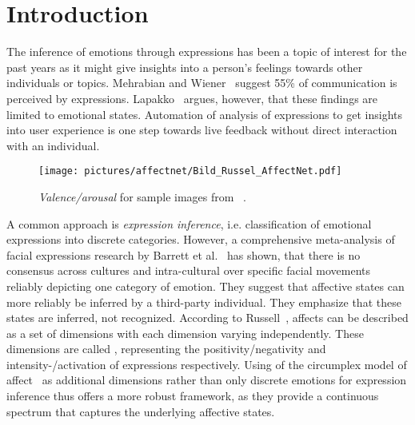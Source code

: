 \section{Introduction}
\label{sec:intro} 

The inference of emotions through expressions has been a topic of interest for the past years as it might give insights into a person's feelings towards other individuals or topics. Mehrabian and Wiener~\cite{mehrabian1967decoding} suggest 55\% of communication is perceived by expressions. Lapakko~\cite{Lapakko2015CommunicationI9} argues, however, that these findings are limited to emotional states. Automation of analysis of expressions to get insights into user experience is one step towards live feedback without direct interaction with an individual. 

\begin{figure}[t]
    \centering
    \texttt{[image: pictures/affectnet/Bild\_Russel\_AffectNet.pdf]}
    \caption{\textit{Valence/arousal} for sample images from \affectnet{}~\cite{mollahosseini2017affectnet}.}
    \label{fig:Russel_Affectnet}
\end{figure}


A common approach is \textit{expression inference}, i.e. classification of emotional expressions into discrete categories. However, a comprehensive meta-analysis of facial expressions research by Barrett et al.~\cite{barretetal2019}  has shown, that there is no consensus across cultures and intra-cultural over specific facial movements reliably depicting one category of emotion. They suggest that affective states can more reliably be inferred by a third-party individual. They emphasize that these states are inferred, not recognized. According to Russell~\cite{rusellmodell}, affects can be described as a set of dimensions with each dimension varying independently. These dimensions are called \va{}, representing the positivity/negativity and intensity-/activation of expressions respectively. Using \va{} of the circumplex model of affect~\cite{rusellmodell} as additional dimensions rather than only discrete emotions for expression inference thus offers a more robust framework, as they provide a continuous spectrum that captures the underlying affective states.


